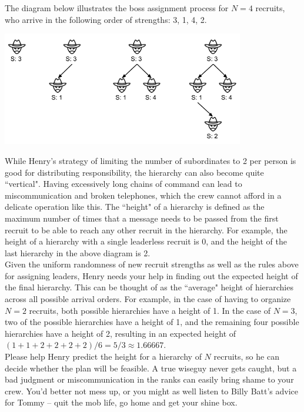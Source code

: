 The diagram below illustrates the boss assignment process for $N = 4$ recruits, who arrive in the following order of strengths: 3, 1, 4, 2.\\

\begin{center}
\includegraphics[width=300pt]{wiseguy}
\end{center}

While Henry's strategy of limiting the number of subordinates to 2 per person is good for distributing responsibility, the hierarchy can also become quite ``vertical". Having excessively long chains of command can lead to miscommunication and broken telephones, which the crew cannot afford in a delicate operation like this. The ``height" of a hierarchy is defined as the maximum number of times that a message needs to be passed from the first recruit to be able to reach any other recruit in the hierarchy. For example, the height of a hierarchy with a single leaderless recruit is 0, and the height of the last hierarchy in the above diagram is 2.\\

Given the uniform randomness of new recruit strengths as well as the rules above for assigning leaders, Henry needs your help in finding out the expected height of the final hierarchy. This can be thought of as the ``average" height of hierarchies across all possible arrival orders. For example, in the case of having to organize $N = 2$ recruits, both possible hierarchies have a height of 1. In the case of $N = 3$, two of the possible hierarchies have a height of 1, and the remaining four possible hierarchies have a height of 2, resulting in an expected height of $(1 + 1 + 2 + 2 + 2 + 2)/6 = 5/3 \approx 1.66667$.\\

Please help Henry predict the height for a hierarchy of $N$ recruits, so he can decide whether the plan will be feasible. A true wiseguy never gets caught, but a bad judgment or miscommunication in the ranks can easily bring shame to your crew. You'd better not mess up, or you might as well listen to Billy Batt's advice for Tommy -- quit the mob life, go home and get your shine box.\\

